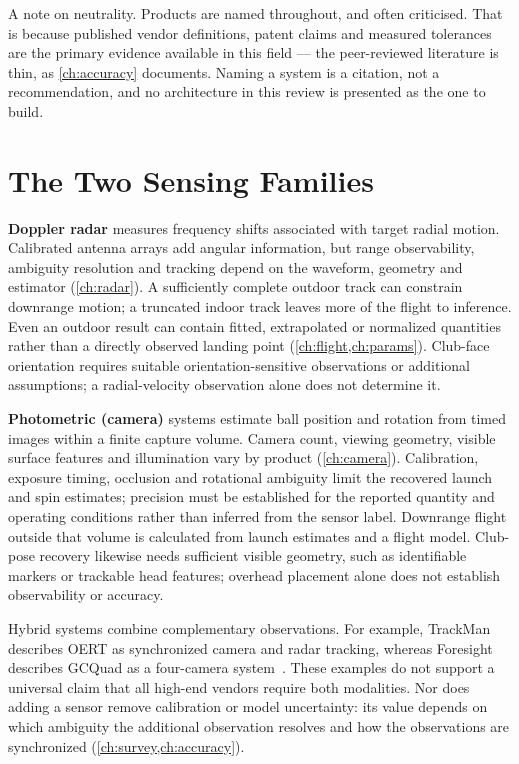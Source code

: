 \begin{keypoint}
A note on neutrality. Products are named throughout, and often criticised.
That is because published vendor definitions, patent claims and measured
tolerances are the primary evidence available in this field --- the
peer-reviewed literature is thin, as \cref{ch:accuracy} documents. Naming a
system is a citation, not a recommendation, and no architecture in this
review is presented as the one to build.
\end{keypoint}

\section{The Two Sensing Families}

\textbf{Doppler radar} measures frequency shifts associated with target radial motion.
Calibrated antenna arrays add angular information, but range observability, ambiguity resolution and tracking depend on the waveform, geometry and estimator (\cref{ch:radar}).
A sufficiently complete outdoor track can constrain downrange motion; a truncated indoor track leaves more of the flight to inference.
Even an outdoor result can contain fitted, extrapolated or normalized quantities rather than a directly observed landing point (\cref{ch:flight,ch:params}).
Club-face orientation requires suitable orientation-sensitive observations or additional assumptions; a radial-velocity observation alone does not determine it.

\textbf{Photometric (camera)} systems estimate ball position and rotation from timed images within a finite capture volume.
Camera count, viewing geometry, visible surface features and illumination vary by product (\cref{ch:camera}).
Calibration, exposure timing, occlusion and rotational ambiguity limit the recovered launch and spin estimates; precision must be established for the reported quantity and operating conditions rather than inferred from the sensor label.
Downrange flight outside that volume is calculated from launch estimates and a flight model.
Club-pose recovery likewise needs sufficient visible geometry, such as identifiable markers or trackable head features; overhead placement alone does not establish observability or accuracy.

Hybrid systems combine complementary observations.
For example, TrackMan describes OERT as synchronized camera and radar tracking, whereas Foresight describes GCQuad as a four-camera system~\cite{trackmanoert,foresightgcquad}.
These examples do not support a universal claim that all high-end vendors require both modalities.
Nor does adding a sensor remove calibration or model uncertainty: its value depends on which ambiguity the additional observation resolves and how the observations are synchronized (\cref{ch:survey,ch:accuracy}).

